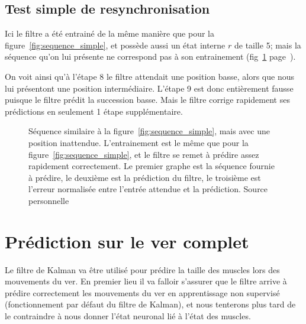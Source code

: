 \subsection{Test simple de resynchronisation} %
\label{sub:Test simple de resynchronisation}

Ici le filtre a été entrainé de la même manière que pour la
figure~\ref{fig:sequence_simple}, et possède aussi un état interne $r$ de
taille 5; mais la séquence qu'on lui présente ne correspond pas à son
entrainement (fig~\ref{fig:sequence_simple_erreur}
page~\pageref{fig:sequence_simple_erreur}).

On voit ainsi qu'à l'étape 8 le filtre attendait une position basse, alors que
nous lui présentont une position intermédiaire. L'étape 9 est donc entièrement
fausse puisque le filtre prédit la succession basse. Mais le filtre corrige
rapidement ses prédictions en seulement 1 étape supplémentaire.

\begin{figure}[ht]
   \begin{center}
   \end{center}
   \caption[Prédiction de séquence simple, avec erreur]{Séquence similaire à la
   figure~\ref{fig:sequence_simple}, mais avec une position inattendue.
   L'entrainement est le même que pour la figure~\ref{fig:sequence_simple}, et
   le filtre se remet à prédire assez rapidement correctement. Le premier graphe
   est la séquence fournie à prédire, le deuxième est la prédiction du filtre,
   le troisième est l'erreur normalisée entre l'entrée attendue et la
   prédiction. Source personnelle}
   \label{fig:sequence_simple_erreur}
\end{figure}



\section{Prédiction sur le ver complet} %
\label{sec:Prédiction sur le ver complet}

Le filtre de Kalman va être utilisé pour prédire la taille des muscles lors des
mouvements du ver. En premier lieu il va falloir s'assurer que le filtre arrive
à prédire correctement les mouvements du ver en apprentissage non supervisé
(fonctionnement par défaut du filtre de Kalman), et nous tenterons plus tard de
le contraindre à nous donner l'état neuronal lié à l'état des muscles.

